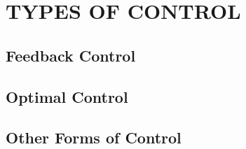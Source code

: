 \chapter{TYPES OF CONTROL}

\section{Feedback Control}

\section{Optimal Control}

\section{Other Forms of Control}